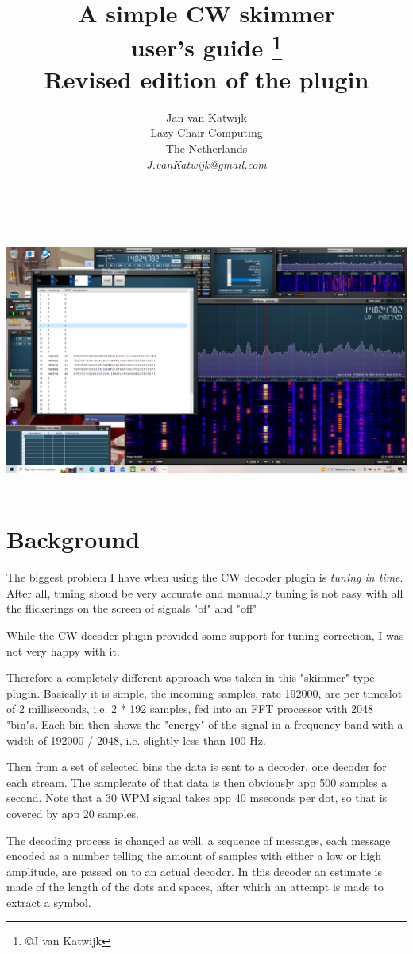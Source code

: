 \documentclass[10pt]{article}
\begin{document}
\title{A simple CW skimmer\\
{\small user's guide {\footnote {\copyright J van Katwijk}}\\
Revised edition of the plugin}}
\author{
Jan van Katwijk\\
Lazy Chair Computing \\
The Netherlands\\
{\em J.vanKatwijk@gmail.com}}
\maketitle
\ \\
\ \\
\includegraphics[width=160mm]{skimmer-plugin.png}
\ \\
\section{Background}
The biggest problem I have when using the CW decoder plugin is {\em tuning
in time}.  After all, tuning shoud be very accurate and manually tuning is not
easy with all the flickerings on the screen of signals "of" and "off"
\par
While the CW decoder plugin provided some support for tuning correction,
I was not very happy with it.
\par
Therefore a completely different approach was taken in this "skimmer" type
plugin.
Basically it is simple, the incoming samples, rate 192000, are per
timeslot of 2 milliseconds, i.e. 2 * 192 samples, fed into
an FFT processor with 2048 "bin"s.
Each bin then shows the "energy" of the signal in a frequency band with
a width of 192000 / 2048, i.e. slightly less than 100 Hz.
\par
Then from a set of selected bins the data is sent to a decoder, one
decoder for each stream.
The samplerate of that data is then obviously app 500 samples a second.
Note that a 30 WPM signal takes app 40 mseconds per dot, so that is covered
by app 20 samples.
\par
The decoding process is changed as well, a sequence of
messages, each message encoded as a number telling the amount of samples with
either a low or high amplitude, are passed on to an actual decoder.
In this decoder an estimate is made of the length of the dots and spaces,
after which an attempt is made to extract a symbol.
\par
\end{document}
